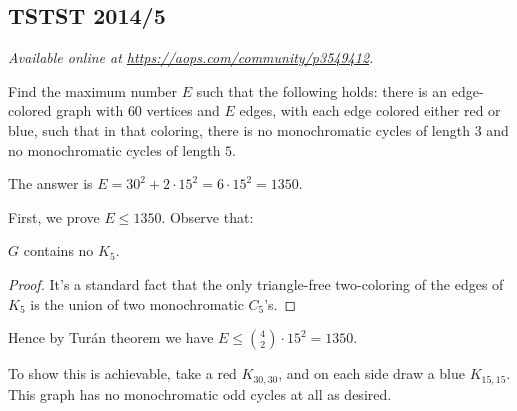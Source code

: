 \documentclass[11pt]{scrartcl}
\begin{document}
\subsection{TSTST 2014/5}
\textsl{Available online at \url{https://aops.com/community/p3549412}.}
\begin{mdframed}[style=mdpurplebox,frametitle={Problem statement}]
Find the maximum number $E$ such that the following holds:
there is an edge-colored graph with $60$ vertices and $E$ edges,
with each edge colored either red or blue, such that in that coloring,
there is no monochromatic cycles of length $3$
and no monochromatic cycles of length $5$.
\end{mdframed}
The answer is $E = 30^2 + 2 \cdot 15^2 = 6 \cdot 15^2 = 1350$.

First, we prove $E \le 1350$.  Observe that:
\begin{claim*}
  $G$ contains no $K_5$.
\end{claim*}
\begin{proof}
  It's a standard fact that the only triangle-free two-coloring
  of the edges of $K_5$ is the union of two monochromatic $C_5$'s.
\end{proof}
Hence by Tur\'{a}n theorem we have $E \le \binom42 \cdot 15^2 = 1350$.

To show this is achievable, take a red $K_{30,30}$,
and on each side draw a blue $K_{15,15}$.
This graph has no monochromatic odd cycles at all as desired.
\pagebreak
\end{document}
